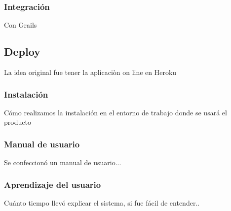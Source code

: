 \subsubsection{Integración}
Con Grails
\subsection{Deploy}
La idea original fue tener la aplicaciòn on line en Heroku
\subsubsection{Instalación}
Cómo realizamos la instalación en el entorno de trabajo donde se usará el producto
\subsubsection{Manual de usuario}
Se confeccionó un manual de usuario...
\subsubsection{Aprendizaje del usuario}
Cuánto tiempo llevó explicar el sistema, si fue fácil de entender..